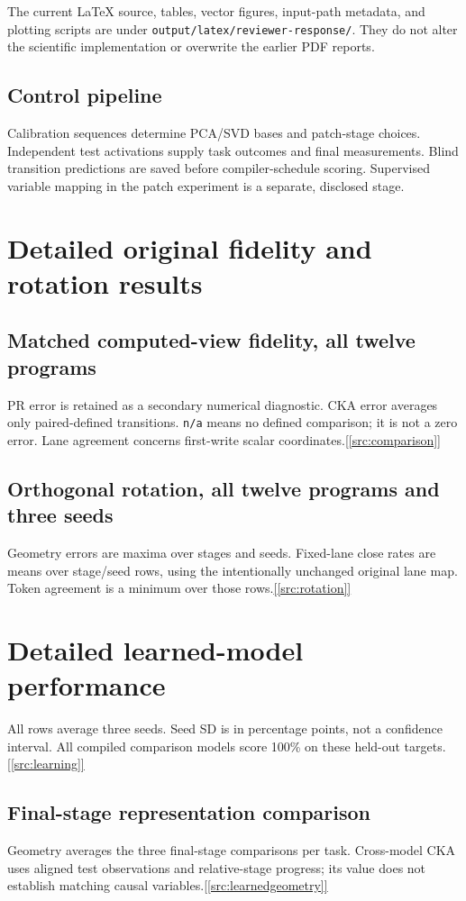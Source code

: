 \documentclass[10pt,a4paper]{article}
\newcommand{\newsection}[1]{\clearpage\section{#1}}
\newcommand{\ev}[1]{\hyperref[src:#1]{[\ref*{src:#1}]}}
\begin{document}
The current LaTeX source, tables, vector figures, input-path metadata, and plotting scripts are under \nolinkurl{output/latex/reviewer-response/}. They do not alter the scientific implementation or overwrite the earlier PDF reports.

\subsection*{Control pipeline}
Calibration sequences determine PCA/SVD bases and patch-stage choices. Independent test activations supply task outcomes and final measurements. Blind transition predictions are saved before compiler-schedule scoring. Supervised variable mapping in the patch experiment is a separate, disclosed stage.

\newsection{Detailed original fidelity and rotation results}
\subsection*{Matched computed-view fidelity, all twelve programs}

PR error is retained as a secondary numerical diagnostic. CKA error averages only paired-defined transitions. \texttt{n/a} means no defined comparison; it is not a zero error. Lane agreement concerns first-write scalar coordinates.\ev{comparison}

\subsection*{Orthogonal rotation, all twelve programs and three seeds}

Geometry errors are maxima over stages and seeds. Fixed-lane close rates are means over stage/seed rows, using the intentionally unchanged original lane map. Token agreement is a minimum over those rows.\ev{rotation}

\newsection{Detailed learned-model performance}
All rows average three seeds. Seed SD is in percentage points, not a confidence interval. All compiled comparison models score 100\% on these held-out targets.\ev{learning}


\subsection*{Final-stage representation comparison}

Geometry averages the three final-stage comparisons per task. Cross-model CKA uses aligned test observations and relative-stage progress; its value does not establish matching causal variables.\ev{learnedgeometry}
\end{document}
